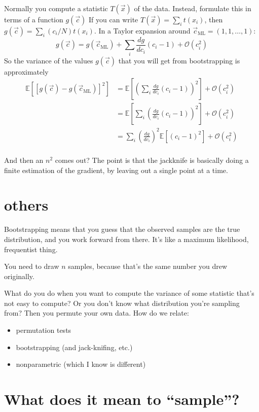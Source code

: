 \documentclass{book}
\providecommand{\tightlist}{%
  \setlength{\itemsep}{0pt}\setlength{\parskip}{0pt}}
\newcommand{\expect}[1]{\mathbb{E}\!\left[{#1}\right]}
\begin{document}
Normally you compute a statistic $T(\vec{x})$ of the data. Instead, formulate
this in terms of a function $g(\vec{c})$ If you can write $T(\vec{x}) = \sum_i t(x_i)$,
then $g(\vec{c}) = \sum_i (c_i/N) t(x_i)$. In a Taylor expansion around
$\vec{c}_\mathrm{ML} = (1, 1, \ldots, 1)$:
$$
g(\vec{c}) = g(\vec{c}_\mathrm{ML}) + \sum_i \frac{dg}{dc_i} (c_i - 1) + \mathcal{O}(c_i^2)
$$
So the variance of the values $g(\vec{c})$ that you will get from
bootstrapping is approximately
\begin{align}
\expect{\left[g(\vec{c}) - g(\vec{c}_\mathrm{ML})\right]^2}
  &= \expect{\left(\sum_i \frac{dg}{dc_i} (c_i-1)\right)^2} + \mathcal{O}(c_i^2) \\
  &= \expect{\sum_i \left( \frac{dg}{dc_i} (c_i-1)\right)^2} + \mathcal{O}(c_i^2) \\
  &= \sum_i \left(\frac{dg}{dc_i}\right)^2 \expect{(c_i-1)^2} + \mathcal{O}(c_i^2) \\
\end{align}

And then an $n^2$ comes out? The point is that the jackknife is basically
doing a finite estimation of the gradient, by leaving out a single point at a
time.

\section{others}

Bootstrapping means that you guess that the observed samples are the true
distribution, and you work forward from there. It's like a maximum likelihood,
frequentist thing.

You need to draw $n$ samples, because that's the same number you drew originally.

What do you do when you want to compute the variance of some statistic
that's not easy to compute? Or you don't know what distribution you're
sampling from? Then you permute your own data. How do we relate:

\begin{itemize}
\tightlist
\item
  permutation tests
\item
  bootstrapping (and jack-knifing, etc.)
\item
  nonparametric (which I know is different)
\end{itemize}

\section{\texorpdfstring{What does it mean to
``sample''?}{What does it mean to sample?}}\label{what-does-it-mean-to-sample}
\end{document}
